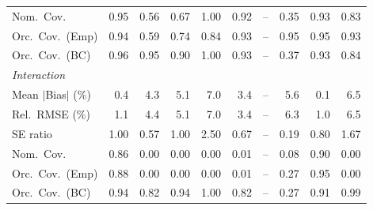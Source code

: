 \begin{table}[!htbp]
{\begin{tabular}{lrrrrrrrrr}
\quad Nom.\ Cov. & \cellcolor{rankone}0.95 & 0.56 & 0.67 & 1.00 & \cellcolor{rankthree}0.92 & -- & 0.35 & \cellcolor{ranktwo}0.93 & 0.83 \\
\quad Orc.\ Cov.\ (Emp) & \cellcolor{ranktwo}0.94 & 0.59 & 0.74 & 0.84 & \cellcolor{rankthree}0.93 & -- & \cellcolor{rankone}0.95 & \cellcolor{rankone}0.95 & \cellcolor{rankthree}0.93 \\
\quad Orc.\ Cov.\ (BC) & \cellcolor{ranktwo}0.96 & \cellcolor{rankone}0.95 & 0.90 & 1.00 & \cellcolor{rankthree}0.93 & -- & 0.37 & \cellcolor{rankthree}0.93 & 0.84 \\
\midrule
\multicolumn{10}{l}{\textit{Interaction}} \\[2pt]
\quad Mean $|$Bias$|$ (\%) & \cellcolor{ranktwo}0.4 & 4.3 & 5.1 & 7.0 & \cellcolor{rankthree}3.4 & -- & 5.6 & \cellcolor{rankone}0.1 & 6.5 \\
\quad Rel.\ RMSE (\%) & \cellcolor{ranktwo}1.1 & 4.4 & 5.1 & 7.0 & \cellcolor{rankthree}3.4 & -- & 6.3 & \cellcolor{rankone}1.0 & 6.5 \\
\quad SE ratio & \cellcolor{rankone}1.00 & 0.57 & \cellcolor{rankone}1.00 & 2.50 & \cellcolor{rankthree}0.67 & -- & 0.19 & \cellcolor{ranktwo}0.80 & 1.67 \\
\quad Nom.\ Cov. & \cellcolor{ranktwo}0.86 & 0.00 & 0.00 & 0.00 & 0.01 & -- & \cellcolor{rankthree}0.08 & \cellcolor{rankone}0.90 & 0.00 \\
\quad Orc.\ Cov.\ (Emp) & \cellcolor{ranktwo}0.88 & 0.00 & 0.00 & 0.00 & 0.01 & -- & \cellcolor{rankthree}0.27 & \cellcolor{rankone}0.95 & 0.00 \\
\quad Orc.\ Cov.\ (BC) & \cellcolor{rankone}0.94 & 0.82 & \cellcolor{rankone}0.94 & \cellcolor{rankthree}1.00 & 0.82 & -- & 0.27 & \cellcolor{ranktwo}0.91 & \cellcolor{ranktwo}0.99 \\
\bottomrule
\end{tabular}}
\end{table}
